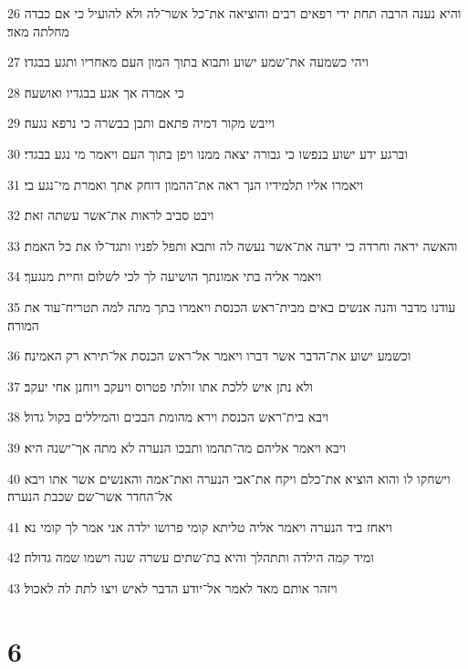 \par 26 והיא נענה הרבה תחת ידי רפאים רבים והוציאה את־כל אשר־לה ולא להועיל כי אם כבדה מחלתה מאד׃
\par 27 ויהי כשמעה את־שמע ישוע ותבוא בתוך המון העם מאחריו ותגע בבגדו׃
\par 28 כי אמרה אך אגע בבגדיו ואושעה׃
\par 29 וייבש מקור דמיה פתאם ותבן בבשרה כי נרפא נגעה׃
\par 30 וברגע ידע ישוע בנפשו כי גבורה יצאה ממנו ויפן בתוך העם ויאמר מי נגע בבגדי׃
\par 31 ויאמרו אליו תלמידיו הנך ראה את־ההמון דוחק אתך ואמרת מי־נגע בי׃
\par 32 ויבט סביב לראות את־אשר עשתה זאת׃
\par 33 והאשה יראה וחרדה כי ידעה את־אשר נעשה לה ותבא ותפל לפניו ותגד־לו את כל האמת׃
\par 34 ויאמר אליה בתי אמונתך הושיעה לך לכי לשלום וחיית מנגעך׃
\par 35 עודנו מדבר והנה אנשים באים מבית־ראש הכנסת ויאמרו בתך מתה למה תטריח־עוד את המורה׃
\par 36 וכשמע ישוע את־הדבר אשר דברו ויאמר אל־ראש הכנסת אל־תירא רק האמינה׃
\par 37 ולא נתן איש ללכת אתו זולתי פטרוס ויעקב ויוחנן אחי יעקב׃
\par 38 ויבא בית־ראש הכנסת וירא מהומת הבכים והמיללים בקול גדול׃
\par 39 ויבא ויאמר אליהם מה־תהמו ותבכו הנערה לא מתה אך־ישנה היא׃
\par 40 וישחקו לו והוא הוציא את־כלם ויקח את־אבי הנערה ואת־אמה והאנשים אשר אתו ויבא אל־החדר אשר־שם שכבת הנערה׃
\par 41 ויאחז ביד הנערה ויאמר אליה טליתא קומי פרושו ילדה אני אמר לך קומי נא׃
\par 42 ומיד קמה הילדה ותתהלך והיא בת־שתים עשרה שנה וישמו שמה גדולה׃
\par 43 ויזהר אותם מאד לאמר אל־יודע הדבר לאיש ויצו לתת לה לאכול׃

\chapter{6}

